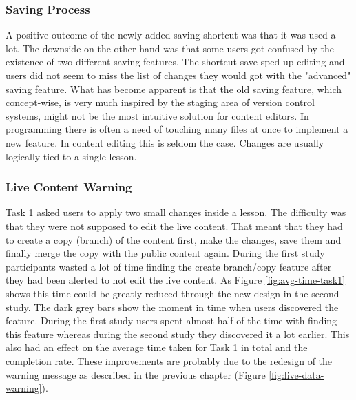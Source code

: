 
\subsubsection{Saving Process}
A positive outcome of the newly added saving shortcut was that it was used a lot. The downside on the other hand was that some users got confused by the existence of two different saving features. The shortcut save sped up editing and users did not seem to miss the list of changes they would got with the "advanced" saving feature. What has become apparent is that the old saving feature, which concept-wise, is very much inspired by the staging area of version control systems, might not be the most intuitive solution for content editors. In programming there is often a need of touching many files at once to implement a new feature. In content editing this is seldom the case. Changes are usually logically tied to a single lesson.

\subsubsection{Live Content Warning} \label{sec:live-content-warning}
Task 1 asked users to apply two small changes inside a lesson. The difficulty was that they were not supposed to edit the live content. That meant that they had to create a copy (branch) of the content first, make the changes, save them and finally merge the copy with the public content again. During the first study participants wasted a lot of time finding the create branch/copy feature after they had been alerted to not edit the live content. As Figure \ref{fig:avg-time-task1} shows this time could be greatly reduced through the new design in the second study. The dark grey bars show the moment in time when users discovered the feature. During the first study users spent almost half of the time with finding this feature whereas during the second study they discovered it a lot earlier. This also had an effect on the average time taken for Task 1 in total and the completion rate. These improvements are probably due to the redesign of the warning message as described in the previous chapter (Figure \ref{fig:live-data-warning}).

